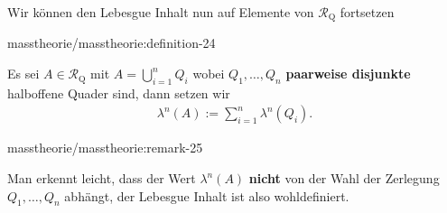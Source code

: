 \par
Wir können den Lebesgue Inhalt nun auf Elemente von \(\mathcal{R}_{\text{Q}}\) fortsetzen
\begin{definition}{}{masstheorie/masstheorie:definition-24}



\par
Es sei \(A\in\mathcal{R}_{\text{Q}}\) mit \(A=\bigcup_{i=1}^n Q_i\) wobei \(Q_1,\ldots,Q_n\) \textbf{paarweise disjunkte} halboffene Quader sind, dann setzen wir
\begin{align*}
\lambda^n(A):=\sum_{i=1}^{n} \lambda^n(Q_i).
\end{align*}\end{definition}
\begin{remark}{}{masstheorie/masstheorie:remark-25}



\par
Man erkennt leicht, dass der Wert \(\lambda^n(A)\) \textbf{nicht} von der Wahl der Zerlegung \(Q_1,\ldots,Q_n\) abhängt, der Lebesgue Inhalt ist also wohldefiniert.
\end{remark}

